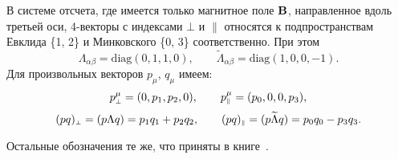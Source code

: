 В системе отсчета, где имеется только магнитное поле $\bf B$, направленное 
вдоль третьей оси, 4-векторы с индексами $\bot$ и $\parallel$ относятся 
к подпространствам Евклида \{1, 2\} и Минковского \{0, 3\} соответственно.
При этом 
%
$$\Lambda_{\alpha \beta} = \mbox{diag}(0, 1, 1, 0), \qquad 
\widetilde \Lambda_{\alpha \beta} = \mbox{diag}(1, 0, 0, -1).$$
% 
Для произвольных векторов $p_\mu$, $q_\mu$ имеем:
%
$$p_{\mbox{\tiny $\bot$}}^\mu = (0, p_1, p_2, 0), \qquad p_{\mbox{\tiny $\|$}}^\mu = (p_0, 0, 0, p_3),$$
%
$$(pq)_{\mbox{\tiny $\bot$}} = (p \Lambda q) =  p_1 q_1 + p_2 q_2, \qquad 
(pq)_{\mbox{\tiny $\|$}} = (p \widetilde \Lambda q) = p_0 q_0 - p_3 q_3.$$  

Остальные обозначения те же, что приняты в книге~\cite{Berestetskii:1989}.